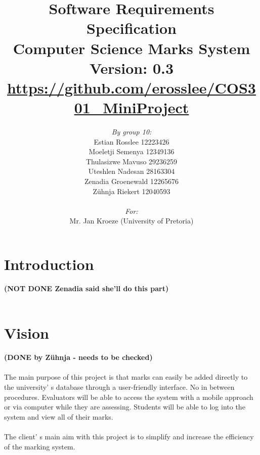 \documentclass[11pt,a4paper]{article}
\begin{document}
\begin{titlepage}
\title{\textbf{Software Requirements Specification}\\Computer Science Marks System\\ \small Version: 0.3\\ \url{https://github.com/erosslee/COS301_MiniProject}}

\author{\textit{By group 10:} \\Estian Rosslee 12223426\\Moeletji Semenya 12349136\\Thulasizwe Mavuso 29236259\\Uteshlen Nadesan 28163304\\Zenadia Groenewald 12265676\\Z\"uhnja Riekert 12040593\\ \\
\textit{For:} \\Mr. Jan Kroeze (University of Pretoria)}



\maketitle
\end{titlepage}
\pagebreak
\tableofcontents
\pagebreak
\section{Introduction}
\textbf{(NOT DONE Zenadia said she'll do this part)}\\ \\


\section{Vision}
\textbf{(DONE by Z\"uhnja - needs to be checked)}\\ \\
The main purpose of this project is that marks can easily be added directly to the university\textquoteright
s database through a user-friendly interface. No in between procedures.   Evaluators will be able to access the system with a mobile approach or via computer while they are assessing.  Students will be able to log into the system and view all of their marks. \\ \\
The client\textquoteright
s main aim with this project is to simplify and increase the efficiency of the marking system.
\end{document}
